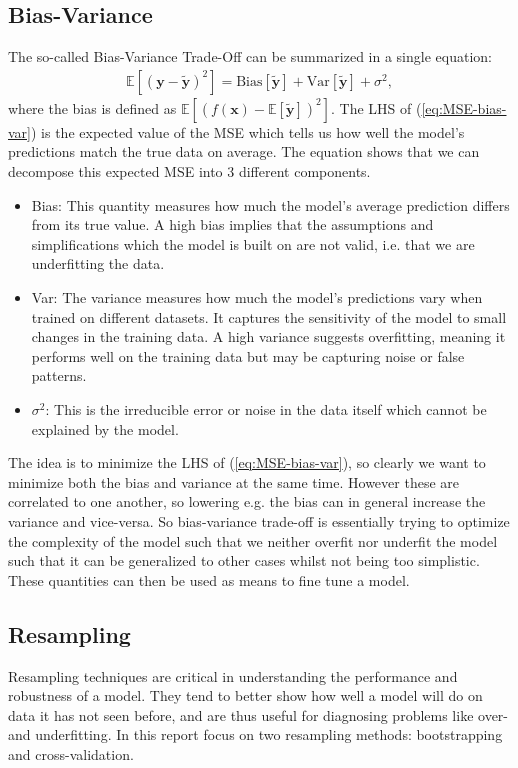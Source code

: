 \documentclass[%
reprint,
amsmath,amssymb,
aps,
pra,
]{revtex4-2}
\begin{document}
\subsection{Bias-Variance}
The so-called Bias-Variance Trade-Off can be summarized in a single equation:
\begin{align}
	\mathbb{E}[(\bm y-\tilde{\bm y})^2]=\text{Bias}[\tilde{\bm y}]+\text{Var}[\tilde{\bm y}]+\sigma^2,
	\label{eq:MSE-bias-var}
\end{align}
where the bias is defined as $\mathbb E[(f(\bm x)-\mathbb E[\tilde{\bm y}])^2]$. The LHS of (\ref{eq:MSE-bias-var}) is the expected value of the MSE which tells us how well the model's predictions match the true data on average. The equation shows that we can decompose this expected MSE into 3 different components.
\begin{itemize}
	\item Bias: This quantity measures how much the model's average prediction differs from its true value. A high bias implies that the assumptions and simplifications which the model is built on are not valid, i.e. that we are underfitting the data.
	\item Var: The variance measures how much the model's predictions vary when trained on different datasets. It captures the sensitivity of the model to small changes in the training data. A high variance suggests overfitting, meaning it performs well on the training data but may be capturing noise or false patterns.
	\item $\sigma^2$: This is the irreducible error or noise in the data itself which cannot be explained by the model.
\end{itemize}
The idea is to minimize the LHS of (\ref{eq:MSE-bias-var}), so clearly we want to minimize both the bias and variance at the same time. However these are correlated to one another, so lowering e.g. the bias can in general increase the variance and vice-versa. So bias-variance trade-off is essentially trying to optimize the complexity of the model such that we neither overfit nor underfit the model such that it can be generalized to other cases whilst not being too simplistic. These quantities can then be used as means to fine tune a model.

\subsection{Resampling}
Resampling techniques are critical in understanding the performance and robustness of a model. They tend to better show how well a model will do on data it has not seen before, and are thus useful for diagnosing problems like over- and underfitting. In this report focus on two resampling methods: bootstrapping and cross-validation.
\end{document}
